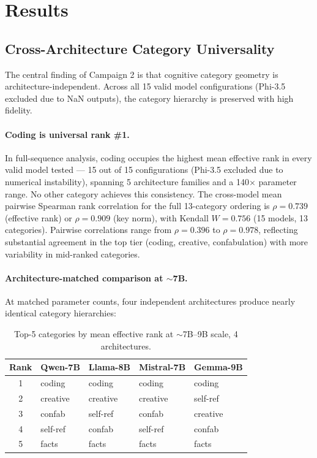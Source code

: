 \documentclass[11pt,a4paper]{article}
\begin{document}
\section{Results}
\label{sec:results}

\subsection{Cross-Architecture Category Universality}
\label{sec:universality}

The central finding of Campaign 2 is that cognitive category geometry is architecture-independent. Across all 15 valid model configurations (Phi-3.5 excluded due to NaN outputs), the category hierarchy is preserved with high fidelity.

\paragraph{Coding is universal rank \#1.} In full-sequence analysis, coding occupies the highest mean effective rank in every valid model tested --- 15 out of 15 configurations (Phi-3.5 excluded due to numerical instability), spanning 5 architecture families and a 140$\times$ parameter range. No other category achieves this consistency. The cross-model mean pairwise Spearman rank correlation for the full 13-category ordering is $\rho = 0.739$ (effective rank) or $\rho = 0.909$ (key norm), with Kendall $W = 0.756$ (15 models, 13 categories). Pairwise correlations range from $\rho = 0.396$ to $\rho = 0.978$, reflecting substantial agreement in the top tier (coding, creative, confabulation) with more variability in mid-ranked categories.

\paragraph{Architecture-matched comparison at $\sim$7B.} At matched parameter counts, four independent architectures produce nearly identical category hierarchies:

\begin{table}[H]
\centering
\caption{Top-5 categories by mean effective rank at $\sim$7B--9B scale, 4 architectures.}
\label{tab:cross_arch_7b}
\begin{tabular}{cllll}
\toprule
\textbf{Rank} & \textbf{Qwen-7B} & \textbf{Llama-8B} & \textbf{Mistral-7B} & \textbf{Gemma-9B} \\
\midrule
1 & coding & coding & coding & coding \\
2 & creative & creative & creative & self-ref \\
3 & confab & self-ref & confab & creative \\
4 & self-ref & confab & self-ref & confab \\
5 & facts & facts & facts & facts \\
\bottomrule
\end{tabular}
\end{table}
\end{document}
